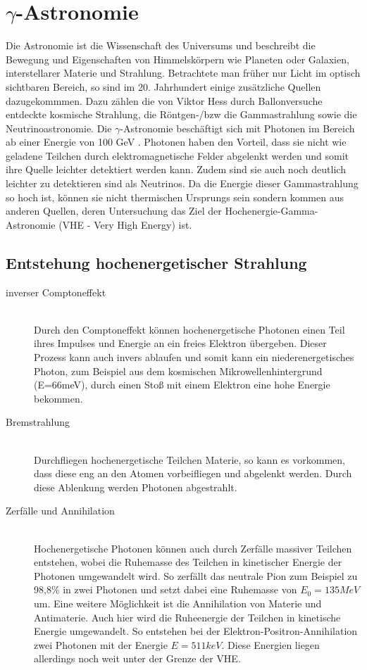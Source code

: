 \chapter{$\gamma$-Astronomie} 
Die Astronomie ist die Wissenschaft des Universums und beschreibt die Bewegung und Eigenschaften von Himmelskörpern wie Planeten oder Galaxien, interstellarer Materie und Strahlung. Betrachtete man früher nur Licht im optisch sichtbaren Bereich, so sind im 20. Jahrhundert einige zusätzliche Quellen dazugekommmen. Dazu zählen die von Viktor Hess durch Ballonversuche entdeckte kosmische Strahlung, die Röntgen-/bzw die Gammastrahlung sowie die Neutrinoastronomie. Die $\gamma$-Astronomie beschäftigt sich mit Photonen im Bereich ab einer Energie von 100 GeV \cite{DesignConcept}. Photonen haben den Vorteil, dass sie nicht wie geladene Teilchen durch elektromagnetische Felder abgelenkt werden und somit ihre Quelle leichter detektiert werden kann. Zudem sind sie auch noch deutlich leichter zu detektieren sind als Neutrinos. Da die Energie dieser Gammastrahlung so hoch ist, können sie nicht thermischen Ursprungs sein sondern kommen aus anderen Quellen, deren Untersuchung das Ziel der Hochenergie-Gamma-Astronomie (VHE - Very High Energy) ist.

\section{Entstehung hochenergetischer Strahlung}

\begin{description}
\item[inverser Comptoneffekt]\hfill \\
Durch den Comptoneffekt können hochenergetische Photonen einen Teil ihres Impulses und Energie an ein freies Elektron übergeben. Dieser Prozess kann auch invers ablaufen und somit kann ein niederenergetisches Photon, zum Beispiel aus dem kosmischen Mikrowellenhintergrund (E=66meV), durch einen Stoß mit einem Elektron eine hohe Energie bekommen.
\item[Bremstrahlung]\hfill \\
Durchfliegen hochenergetische Teilchen Materie, so kann es vorkommen, dass diese eng an den Atomen vorbeifliegen und abgelenkt werden. Durch diese Ablenkung werden Photonen abgestrahlt.
\item[Zerfälle und Annihilation]\hfill \\ 
Hochenergetische Photonen können auch durch Zerfälle massiver Teilchen entstehen, wobei die Ruhemasse des Teilchen in kinetischer Energie der Photonen umgewandelt wird. So zerfällt das neutrale Pion zum Beispiel zu 98,8\% \cite{PDG} in zwei Photonen und setzt dabei eine Ruhemasse von $E_0=135MeV$ \cite{PDG} um. Eine weitere Möglichkeit ist die Annihilation von Materie und Antimaterie. Auch hier wird die Ruheenergie der Teilchen in kinetische Energie umgewandelt. So entstehen bei der Elektron-Positron-Annihilation zwei Photonen mit der Energie $E=511keV$.
Diese Energien liegen allerdings noch weit unter der Grenze der VHE.

\end{description}

